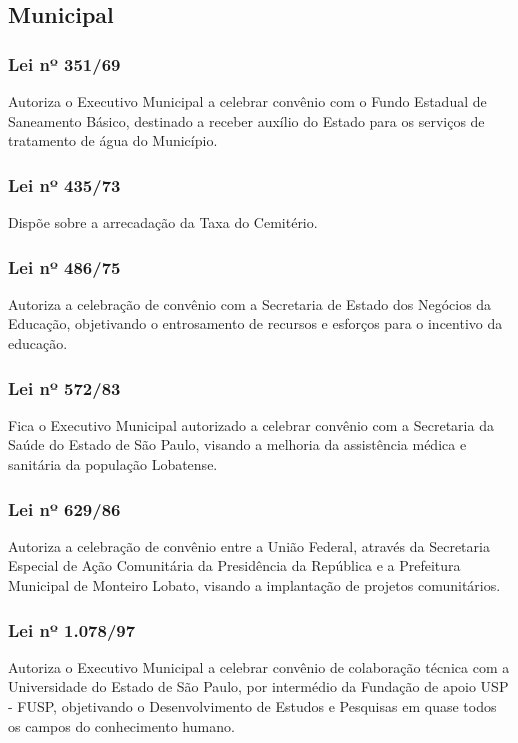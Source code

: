  \begin{subapend}
 	 \subsection{Municipal}
 	\begin{subsubapend}
 		\item \subsubsection{Lei nº 351/69}
 		Autoriza o Executivo Municipal a celebrar convênio com o Fundo Estadual de Saneamento Básico, destinado a receber auxílio do Estado para os serviços de tratamento de água do Município.
 		\subsubsection{Lei nº 435/73}
 		Dispõe sobre a arrecadação da Taxa do Cemitério.
 		\subsubsection{Lei nº 486/75}
 		Autoriza a celebração de convênio com a Secretaria de Estado dos Negócios da Educação, objetivando o entrosamento de recursos e esforços para o incentivo da educação.
 		\subsubsection{Lei nº 572/83}
 		Fica o Executivo Municipal autorizado a celebrar convênio com a Secretaria da Saúde do Estado de São Paulo, visando a melhoria da assistência médica e sanitária da população Lobatense.
 		\subsubsection{Lei nº 629/86}
 		Autoriza a celebração de convênio entre a União Federal, através da Secretaria Especial de Ação Comunitária da Presidência da República e a Prefeitura Municipal de Monteiro Lobato, visando a implantação de projetos comunitários.
 		\subsubsection{Lei nº 1.078/97}
 		Autoriza o Executivo Municipal a celebrar convênio de colaboração técnica com a Universidade do Estado de São Paulo, por intermédio da Fundação de apoio USP - FUSP, objetivando o Desenvolvimento de Estudos e Pesquisas em quase todos os campos do conhecimento humano.

\end{subsubapend}
\end{subapend}
